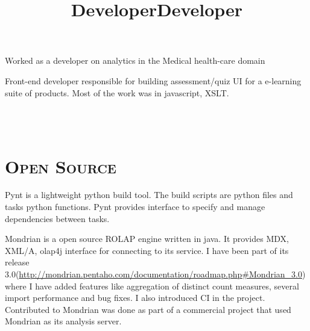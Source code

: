 \begin{resume}
\title{Developer}
\begin{position}
Worked as a developer on analytics in the Medical health-care domain
\end{position}

\title{Developer}
\begin{position}
Front-end developer responsible  for building assessment/quiz UI for a e-learning suite of products. Most of the work was in javascript, XSLT. 
\end{position}






\begin{formatb}
  \\
  \body\\
\end{formatb}

\section{\textsc{Open Source}}

\begin{position}
Pynt is a lightweight python build tool. The build scripts are python files and tasks python functions. Pynt provides interface to specify and manage dependencies between tasks. 
\end{position}

\begin{position}
Mondrian is a open source ROLAP engine written in java. It provides MDX, XML/A, olap4j interface for connecting to its service. I have been part of its release 3.0(\url{http://mondrian.pentaho.com/documentation/roadmap.php#Mondrian_3.0}) where I have added features like aggregation of distinct count measures, several import performance and bug fixes. I also introduced CI in the project. Contributed to Mondrian  was done as part of a commercial project that used Mondrian as its analysis server.
\end{position}


\end{resume}

